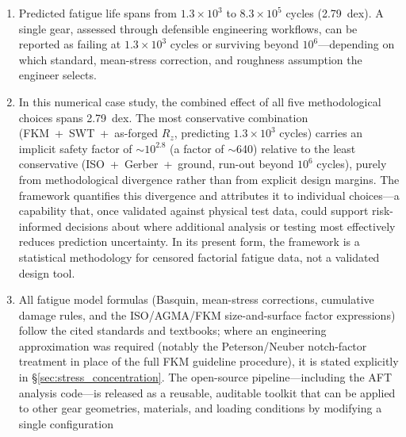 \documentclass[twocolumn,12pt,a4paper]{article}
\begin{document}
\begin{enumerate}
        near-zero result is therefore not a finding about the
        unimportance of S--N curves in general, but about the
        specific contrast between the two datasets selected.
        The cumulative damage rule contributes 0.3\% under
        constant-amplitude loading; this figure must not be extrapolated
        to variable-amplitude spectra, where sequence effects and
        damage-rule differences could produce substantially larger
        divergence.
  \item Predicted fatigue life spans from $1.3\times10^3$ to
        $8.3\times10^5$ cycles (2.79~dex). A single gear, assessed
        through defensible engineering workflows, can be reported as
        failing at $1.3\times10^3$ cycles or surviving beyond $10^6$---depending on
        which standard, mean-stress correction, and roughness
        assumption the engineer selects.
  \item In this numerical case study, the combined effect of all five
        methodological choices spans 2.79~dex. The most conservative
        combination (FKM~+~SWT~+~as-forged $R_z$, predicting
        $1.3\times10^{3}$ cycles) carries an implicit safety factor of
        $\sim$$10^{2.8}$ (a factor of $\sim$640) relative to the
        least conservative (ISO~+~Gerber~+~ground, run-out beyond
        $10^6$ cycles), purely from
        methodological divergence rather than from explicit design
        margins. The framework quantifies this divergence and attributes
        it to individual choices---a capability that, once validated
        against physical test data, could support risk-informed
        decisions about where additional analysis or testing most
        effectively reduces prediction uncertainty. In its present
        form, the framework is a statistical methodology for censored
        factorial fatigue data, not a validated design tool.
  \item All fatigue model formulas (Basquin, mean-stress corrections,
        cumulative damage rules, and the ISO/AGMA/FKM size-and-surface
        factor expressions) follow the cited standards and textbooks;
        where an engineering approximation was required (notably the
        Peterson/Neuber notch-factor treatment in place of the full FKM
        guideline procedure), it is stated explicitly in
        \S\ref{sec:stress_concentration}. The open-source pipeline---including
        the AFT analysis code---is released as a reusable, auditable
        toolkit that can be applied to other gear geometries, materials,
        and loading conditions by modifying a single configuration
$$
\end{enumerate}
\end{document}
